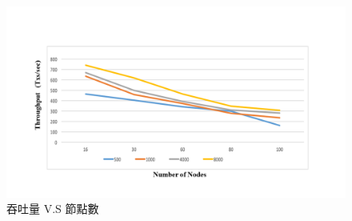 \begin{figure}[htp]
\centering
\includegraphics[scale=0.55]{images/61.png}
\caption{吞吐量 V.S 節點數}
\label{i:byz-latency}
\end{figure}
